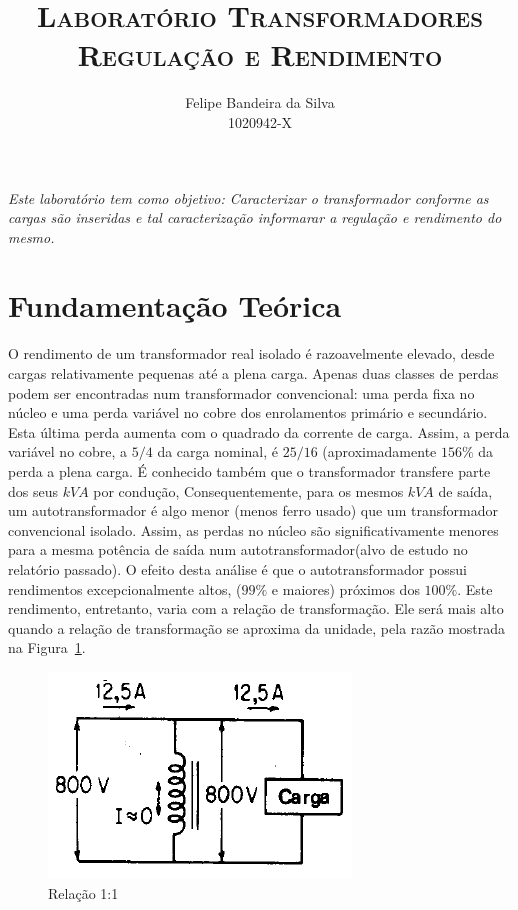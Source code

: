 \documentclass[paper=a4, fontsize=11pt]{article}
\title{\textsc{Laboratório Transformadores\\Regulação e Rendimento}}
\author{Felipe Bandeira da Silva\\1020942-X}
\begin{document}
\maketitle


\textit{Este laboratório tem como objetivo: Caracterizar o transformador conforme as cargas são
inseridas e tal caracterização informarar a regulação e rendimento do mesmo.}

\newpage

\tableofcontents

\newpage

\listoffigures


\newpage
\section{Fundamentação Teórica}

O rendimento de um transformador real isolado é razoavelmente elevado, desde
cargas relativamente pequenas até a plena carga. Apenas duas classes de perdas
podem ser encontradas num transformador convencional: uma perda fixa no núcleo 
e uma perda variável no cobre dos enrolamentos primário e secundário. Esta última
perda aumenta com o quadrado da corrente de carga. Assim, a perda variável no
cobre, a $5/4$ da carga nominal, é $25/16$ (aproximadamente $156\%$ da perda 
a plena carga. É conhecido também que o transformador transfere parte dos seus
$kVA$ por condução, Consequentemente, para os mesmos $kVA$ de saída, um autotransformador
é algo menor (menos ferro usado) que um transformador convencional isolado. Assim, 
as perdas no núcleo são significativamente menores para a mesma potência de saída
num autotransformador(alvo de estudo no relatório passado). O efeito desta análise
é que o autotransformador possui rendimentos excepcionalmente altos, ($99\%$ e maiores)
próximos dos $100\%$. Este rendimento, entretanto, varia com a relação de transformação.
Ele será mais alto quando a relação de transformação se aproxima da unidade, pela razão
mostrada na Figura~\ref{relacao11}.

\begin{figure}[!ht]
    \centering
    \includegraphics[scale=.4]{relacao11.png}
    \caption{Relação 1:1}
    \label{relacao11}
\end{figure}
\end{document}
